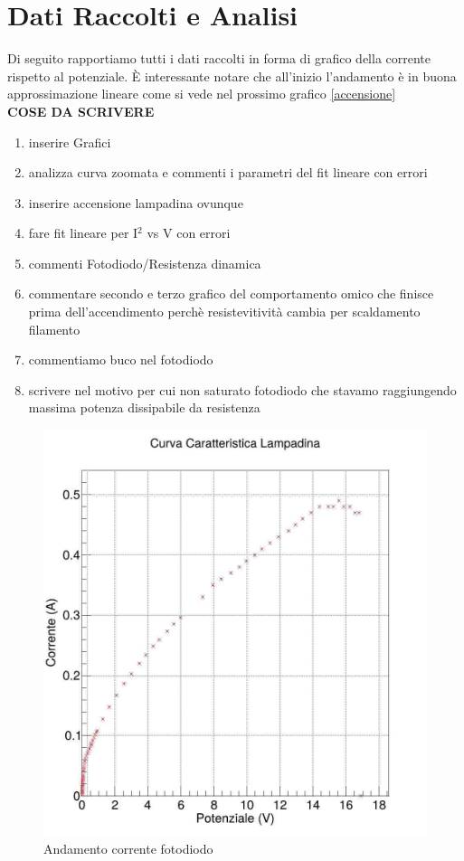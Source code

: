\documentclass[a4paper]{article}
\begin{document}
\newpage
\section{Dati Raccolti e Analisi}
Di seguito rapportiamo tutti i dati raccolti in forma di grafico della corrente rispetto al potenziale. È interessante notare che all'inizio l'andamento è in buona approssimazione lineare come si vede nel prossimo grafico \ref{accensione}\\

\textbf{\huge{COSE DA SCRIVERE}}
\begin{enumerate}
   \item inserire Grafici
   \item analizza curva zoomata e commenti i parametri del fit lineare con errori 
   \item inserire accensione lampadina ovunque
   \item fare fit lineare per I$^2$ vs V con errori
   \item commenti Fotodiodo/Resistenza dinamica
   \item commentare secondo e terzo grafico del comportamento omico che finisce prima dell'accendimento perchè resistevitività cambia per scaldamento filamento
   \item commentiamo buco nel fotodiodo
   \item scrivere nel motivo per cui non saturato fotodiodo che stavamo raggiungendo massima potenza dissipabile da resistenza
\end{enumerate}

\begin{figure}[!htbp]
      \includegraphics[width=\textwidth]{immagini/bruciarelampa.jpg}
        \caption{Andamento corrente fotodiodo}
\end{figure}
\FloatBarrier
\end{document}
